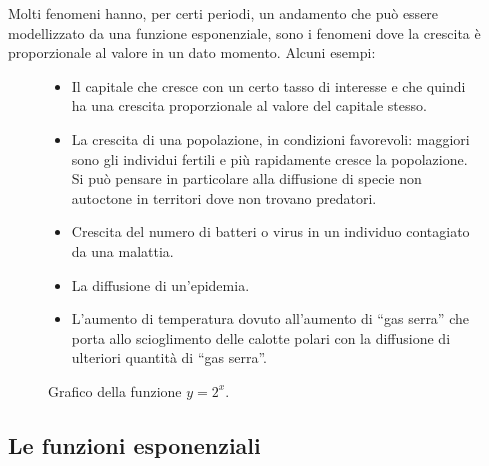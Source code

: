 Molti fenomeni hanno, per certi periodi, un andamento che può essere 
modellizzato da una funzione esponenziale, sono i fenomeni dove la crescita è 
proporzionale al valore in un dato momento. Alcuni esempi:

\begin{figure}[h]
 \centering
 \begin{minipage}[]{.46\textwidth}
\begin{itemize}
\small 
 \item 
Il capitale che cresce con un certo tasso di interesse e che quindi ha una 
crescita proporzionale al valore del capitale stesso.
 \item 
La crescita di una popolazione, in condizioni favorevoli: maggiori sono gli individui fertili e più rapidamente cresce
la popolazione. Si può pensare in particolare alla diffusione di specie non autoctone in 
territori dove non trovano predatori.
 \item 
Crescita del numero di batteri o virus in un 
individuo contagiato da una malattia.
 \item 
La diffusione di un'epidemia.
 \item 
L'aumento di temperatura dovuto all'aumento di ``gas serra'' che porta allo 
scioglimento delle calotte polari con la diffusione di ulteriori quantità di 
``gas serra''.
\end{itemize}

\end{minipage} \quad
\begin{minipage}[]{.48\textwidth}
\begin{center}
\begin{inaccessibleblock}
  \graficoesponenziale
  \caption{Grafico della funzione \(y=2^x\).} \label{fig:funx2^x}
\end{inaccessibleblock}
\end{center}
\end{minipage}
\end{figure}

\subsection{Le funzioni esponenziali}
\label{subsec:esplog_fesponenziale}

